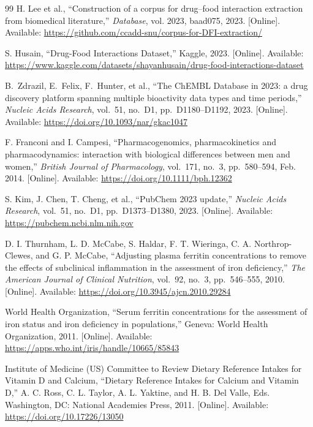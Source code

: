 \begin{thebibliography}{99}
H. Lee et al.,
``Construction of a corpus for drug–food interaction extraction from biomedical literature,''
\textit{Database}, vol. 2023, baad075, 2023.
[Online]. Available: \url{https://github.com/ccadd-snu/corpus-for-DFI-extraction/}

S. Husain,
``Drug-Food Interactions Dataset,''
Kaggle, 2023.
[Online]. Available: \url{https://www.kaggle.com/datasets/shayanhusain/drug-food-interactions-dataset}

B.~Zdrazil, E.~Felix, F.~Hunter, et al.,
``The ChEMBL Database in 2023: a drug discovery platform spanning multiple bioactivity data types and time periods,''
\textit{Nucleic Acids Research}, vol.~51, no.~D1, pp.~D1180--D1192, 2023.
[Online]. Available: \url{https://doi.org/10.1093/nar/gkac1047}

F. Franconi and I. Campesi,
``Pharmacogenomics, pharmacokinetics and pharmacodynamics: interaction with biological differences between men and women,''
\textit{British Journal of Pharmacology}, vol.~171, no.~3, pp.~580--594, Feb. 2014.
[Online]. Available: \url{https://doi.org/10.1111/bph.12362}

S. Kim, J. Chen, T. Cheng, et al.,
``PubChem 2023 update,''
\textit{Nucleic Acids Research}, vol.~51, no.~D1, pp.~D1373--D1380, 2023.
[Online]. Available: \url{https://pubchem.ncbi.nlm.nih.gov}

D. I. Thurnham, L. D. McCabe, S. Haldar, F. T. Wieringa, C. A. Northrop-Clewes, and G. P. McCabe,
``Adjusting plasma ferritin concentrations to remove the effects of subclinical inflammation in the assessment of iron deficiency,''
\textit{The American Journal of Clinical Nutrition}, vol.~92, no.~3, pp.~546--555, 2010.
[Online]. Available: \url{https://doi.org/10.3945/ajcn.2010.29284}

World Health Organization,
``Serum ferritin concentrations for the assessment of iron status and iron deficiency in populations,''
Geneva: World Health Organization, 2011.
[Online]. Available: \url{https://apps.who.int/iris/handle/10665/85843}

Institute of Medicine (US) Committee to Review Dietary Reference Intakes for Vitamin D and Calcium,
``Dietary Reference Intakes for Calcium and Vitamin D,''
A. C. Ross, C. L. Taylor, A. L. Yaktine, and H. B. Del Valle, Eds.
Washington, DC: National Academies Press, 2011.
[Online]. Available: \url{https://doi.org/10.17226/13050}


\end{thebibliography}
